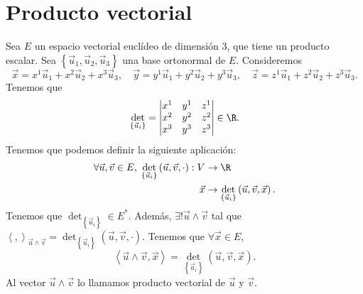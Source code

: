 \section{Producto vectorial}
Sea $\displaystyle E $ un espacio vectorial euclídeo de dimensión 3, que tiene un producto escalar. Sea $\displaystyle \left\{ \vec{u}_{1}, \vec{u}_{2}, \vec{u}_{3}\right\}  $ una base ortonormal de $\displaystyle E $. Consideremos 
\[\vec{x} = x^{1}\vec{u}_{1} +x^{2}\vec{u}_{2} +x^{3}\vec{u}_{3}, \quad \vec{y}= y^{1}\vec{u}_{1} + y^{2}\vec{u}_{2} + y^{3}\vec{u}_{3}, \quad \vec{z} = z^{1}\vec{u}_{1} + z^{2}\vec{u}_{2} + z^{3}\vec{u}_{3} .\]
Tenemos que 
\[\det_{ \left\{ \vec{u}_{i}\right\} } = \begin{vmatrix} x^{1} & y^{1} & z^{1} \\
x^{2} & y^{2} & z^{2} \\
x^{3} & y^{3} & z^{3}\end{vmatrix} \in \R .\]
Tenemos que podemos definir la siguiente aplicación: 
\[
\begin{split}
	\forall \vec{u}, \vec{v} \in E, \; \det_{ \left\{ \vec{u}_{i}\right\} } \left(\vec{u}, \vec{v}, \cdot \right) : V & \to \R \\
	\vec{x} & \to \det_{ \left\{ \vec{u}_{i}\right\} }\left(\vec{u}, \vec{v}, \vec{x}\right).
\end{split}
\]
Tenemos que $\displaystyle \det_{ \left\{ \vec{u}_{i}\right\} } \in E^{*} $. Además, $\displaystyle \exists!\vec{u} \land \vec{v} $ tal que $\displaystyle \left\langle ,  \right\rangle _{\vec{u}\land\vec{v}} = \det_{ \left\{ \vec{u}_{i}\right\} }\left(\vec{u}, \vec{v}, \cdot\right) $. Tenemos que $\displaystyle \forall \vec{x} \in E $, 
\[\left\langle \vec{u}\land\vec{v}, \vec{x} \right\rangle = \det_{ \left\{ \vec{u}_{i}\right\} }\left(\vec{u}, \vec{v}, \vec{x}\right) .\]
Al vector $\displaystyle \vec{u} \land \vec{v} $ lo llamamos producto vectorial de $\displaystyle \vec{u} $ y $\displaystyle \vec{v} $.

